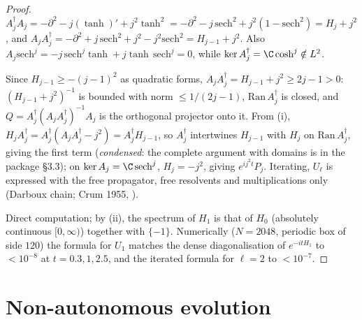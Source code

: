 \begin{proof}
$A_j^\dagger A_j=-\partial^2-j(\tanh)'+j^2\tanh^2=-\partial^2-j\,\mathrm{sech}^2+j^2(1-\mathrm{sech}^2)=H_j+j^2$, and $A_jA_j^\dagger=-\partial^2+j\,\mathrm{sech}^2+j^2-j^2\mathrm{sech}^2=H_{j-1}+j^2$. Also $A_j\mathrm{sech}^j=-j\,\mathrm{sech}^j\tanh+j\tanh\,\mathrm{sech}^j=0$, while $\ker A_j^\dagger=\C\cosh^j\notin L^2$.

Since $H_{j-1}\ge-(j-1)^2$ as quadratic forms, $A_jA_j^\dagger=H_{j-1}+j^2\ge2j-1>0$: $(H_{j-1}+j^2)^{-1}$ is bounded with norm $\le1/(2j-1)$, $\mathrm{Ran}\,A_j^\dagger$ is closed, and $Q=A_j^\dagger(A_jA_j^\dagger)^{-1}A_j$ is the orthogonal projector onto it. From (i), $H_jA_j^\dagger=A_j^\dagger(A_jA_j^\dagger-j^2)=A_j^\dagger H_{j-1}$, so $A_j^\dagger$ intertwines $H_{j-1}$ with $H_j$ on $\mathrm{Ran}\,A_j^\dagger$, giving the first term (\emph{condensed}: the complete argument with domains is in the package \S3.3); on $\ker A_j=\C\,\mathrm{sech}^j$, $H_j=-j^2$, giving $e^{ij^2t}P_j$. Iterating, $U_\ell$ is expressed with the free propagator, free resolvents and multiplications only (Darboux chain; Crum 1955, \cf).

Direct computation; by (ii), the spectrum of $H_1$ is that of $H_0$ (absolutely continuous $[0,\infty)$) together with $\{-1\}$. Numerically ($N=2048$, periodic box of side $120$) the formula for $U_1$ matches the dense diagonalisation of $e^{-itH_1}$ to $<10^{-8}$ at $t=0.3,1,2.5$, and the iterated formula for $\ell=2$ to $<10^{-7}$.

\end{proof}

\section{Non-autonomous evolution}

